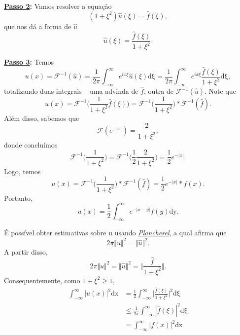 \documentclass[../pde_notes.tex]{subfiles}
\begin{document}
\begin{example}
	\textbf{\underline{Passo 2}:} Vamos resolver a equação
	\[
		(1+\xi ^{2})\hat{u}(\xi ) = \hat{f}(\xi ),
	\]
	que nos dá a forma de \(\hat{u}\)
	\[
		\hat{u}(\xi ) = \frac{\hat{f}(\xi )}{1+\xi^{2}}.
	\]

	\textbf{\underline{Passo 3}:} Temos
	\[
		u(x) = \mathcal{F}^{-1}(\hat{u}) = \frac{1}{2\pi }\int_{-\infty}^{\infty}e^{ix\xi }\hat{u}(\xi ) \mathrm{d\xi } = \frac{1}{2\pi }\int_{-\infty}^{\infty}e^{ix\xi }\frac{\hat{f}(\xi )}{1+\xi^{2}} \mathrm{d\xi },
	\]
	totalizando duas integrais -- uma advinda de \(\hat{f}\), outra de \(\mathcal{F}^{-1}(\hat{u})\). Note que
	\[
		u(x) = \mathcal{F}^{-1}\biggl(\frac{1}{1+\xi^{2}}\hat{f}(\xi )\biggr) = \mathcal{F}^{-1}\biggl(\frac{1}{1+\xi^{2}}\biggr)*\mathcal{F}^{-1}(\hat{f}).
	\]
	Além disso, sabemos que
	\[
		\mathcal{F}(e^{-|x|})=\frac{2}{1+\xi^{2}},
	\]
	donde concluímos
	\[
		\mathcal{F}^{-1}\biggl(\frac{1}{1+\xi^{2}}\biggr) = \mathcal{F}^{-1}\biggl(\frac{1}{2}\frac{2}{1+\xi^{2}}\biggr) = \frac{1}{2}e^{-|x|}.
	\]
	Logo, temos
	\[
		u(x) = \mathcal{F}^{-1}\biggl(\frac{1}{1+\xi^{2}}\biggr)*\mathcal{F}^{-1}(\hat{f}) = \frac{1}{2}e^{-|x|}*f(x).
	\]
	Portanto,
	\[
		u(x) = \frac{1}{2}\int_{-\infty}^{\infty}e^{-|x-y|}f(y) \mathrm{dy}.
	\]
\end{example}
\begin{tcolorbox}[
		skin=enhanced,
		title=Observação,
		fonttitle=\bfseries,
		colframe=black,
		colbacktitle=cyan!75!white,
		colback=cyan!15,
		colbacklower=black,
		coltitle=black,
		drop fuzzy shadow,
	]
	É possível obter estimativas sobre u usando \hyperlink{parseval_plancherel}{\textit{Plancherel}}, a qual afirma que
	\[
		2\pi \Vert u \Vert^{2} = \Vert \hat{u} \Vert^{2}.
	\]
	A partir disso,
	\[
		2\pi \Vert u \Vert^{2} = \Vert \hat{u} \Vert^{2} = \biggl\Vert \frac{\hat{f}}{1+\xi^{2}} \biggr\Vert.
	\]
	Consequentemente, como \(1+\xi^{2} \geq 1\),
	\begin{align*}
		\int_{-\infty}^{\infty}|u(x)|^{2} \mathrm{dx} & = \frac{1}{2}\int_{-\infty}^{\infty}\biggl\vert \frac{\hat{f}(\xi )}{1+\xi^{2}} \biggr\vert^{2} \mathrm{d\xi } \\
		                                              & \leq \frac{1}{2\pi }\int_{-\infty}^{\infty}|\hat{f}(\xi )|^{2} \mathrm{d\xi }                                  \\
		                                              & =\int_{-\infty}^{\infty}|f(x)|^{2} \mathrm{dx}
	\end{align*}
\end{tcolorbox}
\end{document}
